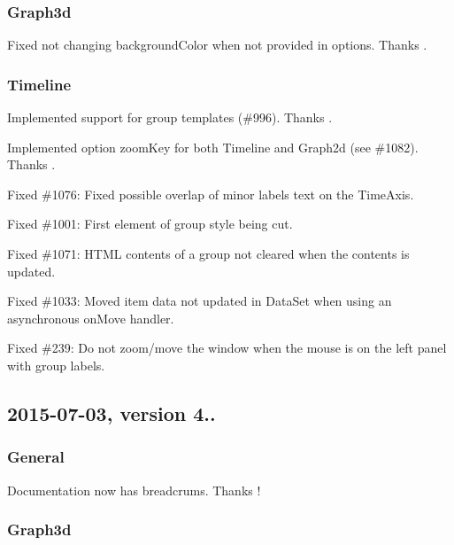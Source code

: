 \subsubsection*{Graph3d}


\begin{DoxyItemize}
\item Fixed not changing {\ttfamily background\+Color} when not provided in options. Thanks .
\end{DoxyItemize}

\subsubsection*{Timeline}


\begin{DoxyItemize}
\item Implemented support for group templates (\#996). Thanks .
\item Implemented option {\ttfamily zoom\+Key} for both Timeline and Graph2d (see \#1082). Thanks .
\item Fixed \#1076\+: Fixed possible overlap of minor labels text on the Time\+Axis.
\item Fixed \#1001\+: First element of group style being cut.
\item Fixed \#1071\+: H\+T\+ML contents of a group not cleared when the contents is updated.
\item Fixed \#1033\+: Moved item data not updated in Data\+Set when using an asynchronous {\ttfamily on\+Move} handler.
\item Fixed \#239\+: Do not zoom/move the window when the mouse is on the left panel with group labels.
\end{DoxyItemize}

\subsection*{2015-\/07-\/03, version 4..}

\subsubsection*{General}


\begin{DoxyItemize}
\item Documentation now has breadcrums. Thanks !
\end{DoxyItemize}

\subsubsection*{Graph3d}


